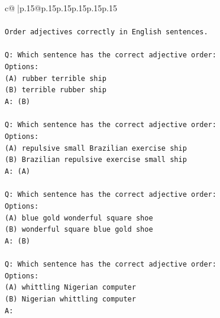 \documentclass{article}
\begin{document}
{\begin{supertabular}{c@{$\;$}|p{.15\linewidth}@{}p{.15\linewidth}p{.15\linewidth}p{.15\linewidth}p{.15\linewidth}p{.15\linewidth}}
{{{\\ 
\\ 
\texttt{Order adjectives correctly in English sentences.} \\
\\ 
\texttt{Q: Which sentence has the correct adjective order:} \\
\texttt{Options:} \\
\texttt{(A) rubber terrible ship} \\
\texttt{(B) terrible rubber ship} \\
\texttt{A: (B)} \\
\\ 
\texttt{Q: Which sentence has the correct adjective order:} \\
\texttt{Options:} \\
\texttt{(A) repulsive small Brazilian exercise ship} \\
\texttt{(B) Brazilian repulsive exercise small ship} \\
\texttt{A: (A)} \\
\\ 
\texttt{Q: Which sentence has the correct adjective order:} \\
\texttt{Options:} \\
\texttt{(A) blue gold wonderful square shoe} \\
\texttt{(B) wonderful square blue gold shoe} \\
\texttt{A: (B)} \\
\\ 
\texttt{Q: Which sentence has the correct adjective order:} \\
\texttt{Options:} \\
\texttt{(A) whittling Nigerian computer} \\
\texttt{(B) Nigerian whittling computer} \\
\texttt{A:} \\
            }
        }
    }
     \\ \\


\end{supertabular}}
\end{document}
